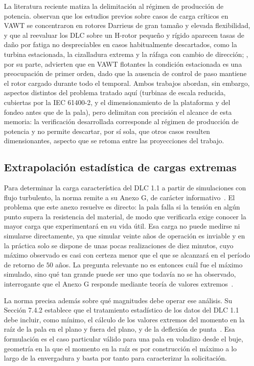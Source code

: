 La literatura reciente matiza la delimitación al régimen de producción de potencia. \textcite{Moore2024} observan que los estudios previos sobre casos de carga críticos en VAWT se concentraron en rotores Darrieus de gran tamaño y elevada flexibilidad, y que al reevaluar los DLC sobre un H-rotor pequeño y rígido aparecen tasas de daño por fatiga no despreciables en casos habitualmente descartados, como la turbina estacionada, la cizalladura extrema y la ráfaga con cambio de dirección; \textcite{Sakib2022}, por su parte, advierten que en VAWT flotantes la condición estacionada es una preocupación de primer orden, dado que la ausencia de control de paso mantiene el rotor cargado durante todo el temporal. Ambos trabajos abordan, sin embargo, aspectos distintos del problema tratado aquí (turbinas de escala reducida, cubiertas por la IEC 61400-2, y el dimensionamiento de la plataforma y del fondeo antes que de la pala), pero delimitan con precisión el alcance de esta memoria: la verificación desarrollada corresponde al régimen de producción de potencia y no permite descartar, por sí sola, que otros casos resulten dimensionantes, aspecto que se retoma entre las proyecciones del trabajo.

\subsection{Extrapolación estadística de cargas extremas}
\label{sec:extrapolacion_teoria}

Para determinar la carga característica del DLC 1.1 a partir de simulaciones con flujo turbulento, la norma remite a su Anexo G, de carácter informativo~\parencite{IEC61400-1}. El problema que este anexo resuelve es directo: la pala falla si la tensión en algún punto supera la resistencia del material, de modo que verificarla exige conocer la mayor carga que experimentará en su vida útil. Esa carga no puede medirse ni simularse directamente, ya que simular veinte años de operación es inviable y en la práctica solo se dispone de unas pocas realizaciones de diez minutos, cuyo máximo observado es casi con certeza menor que el que se alcanzará en el período de retorno de $50$ años. La pregunta relevante no es entonces cuál fue el máximo simulado, sino qué tan grande puede ser uno que todavía no se ha observado, interrogante que el Anexo G responde mediante teoría de valores extremos~\parencite{IEC61400-1}.

La norma precisa además sobre qué magnitudes debe operar ese análisis. Su Sección 7.4.2 establece que el tratamiento estadístico de los datos del DLC 1.1 debe incluir, como mínimo, el cálculo de los valores extremos del momento en la raíz de la pala en el plano y fuera del plano, y de la deflexión de punta~\parencite{IEC61400-1}. Esa formulación es el caso particular válido para una pala en voladizo desde el buje, geometría en la que el momento en la raíz es por construcción el máximo a lo largo de la envergadura y basta por tanto para caracterizar la solicitación.

